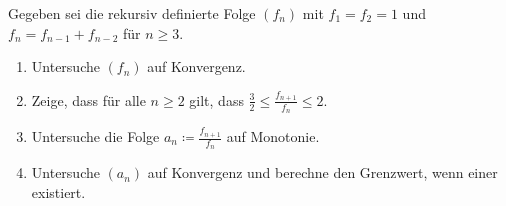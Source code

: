 \begin{prob}
  Gegeben sei die rekursiv definierte Folge $(f_n)$ mit $f_1 = f_2 = 1$ und
  $f_n = f_{n-1} + f_{n-2}$ für $n \geq 3$.
  \begin{enumerate}[label=(\alph*)]
  \item Untersuche $(f_n)$ auf Konvergenz.
  \item Zeige, dass für alle $n \geq 2$ gilt, dass
    $\frac{3}{2} \leq \frac{f_{n+1}}{f_n} \leq 2$.
  \item Untersuche die Folge $a_n \coloneqq \frac{f_{n+1}}{f_n}$ auf Monotonie.
  \item Untersuche $(a_n)$ auf Konvergenz und berechne den Grenzwert, wenn einer
    existiert.
  \end{enumerate}
\end{prob}

